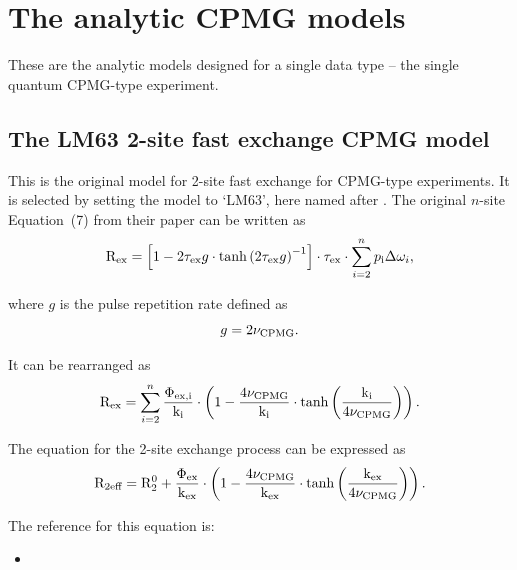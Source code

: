 
\section{The analytic CPMG models}
\label{sect: dispersion: analytic CPMG models}

These are the analytic models designed for a single data type -- the single quantum CPMG-type experiment.



\subsection{The LM63 2-site fast exchange CPMG model}
\label{sect: dispersion: LM63 model}

This is the original model for 2-site fast exchange for CPMG-type experiments.
It is selected by setting the model to `LM63', here named after \citet{LuzMeiboom63}.
The original $n$-site Equation~(7) from their paper can be written as
\begin{equation}
    \mathrm{R}_{\textrm{ex}} = \left[ 1 - 2\tau_{\textrm{ex}} g \cdot \tanh \left( 2\tau_{\textrm{ex}} g \right)^{-1} \right] \cdot \tau_{\textrm{ex}} \cdot \sum_{i=2}^n p_{\textrm{i}}\Delta\omega_{i},
\end{equation}

where $g$ is the pulse repetition rate defined as
\begin{equation}
    g = 2\nu_{\textrm{CPMG}}.
\end{equation}

It can be rearranged as
\begin{equation} \label{eq: Luz-Meiboom}
    \mathrm{R}_{\textrm{ex}} = \sum_{i=2}^n \frac{\Phi_{\textrm{ex,i}}}{\textrm{k}_{\textrm{i}}} \cdot \left( 1 - \frac{4\nu_{\textrm{CPMG}}}{\textrm{k}_{\textrm{i}}} \cdot \tanh \left( \frac{\textrm{k}_\textrm{i}}{4\nu_{\textrm{CPMG}}} \right) \right).
\end{equation}


The equation for the 2-site exchange process can be expressed as
\begin{equation}
    \mathrm{R}_{\textrm{2eff}} = \mathrm{R}_2^0 + \frac{\Phi_{\textrm{ex}}}{\textrm{k}_{\textrm{ex}}} \cdot \left( 1 - \frac{4\nu_{\textrm{CPMG}}}{\textrm{k}_{\textrm{ex}}} \cdot \tanh \left( \frac{\textrm{k}_{\textrm{ex}}}{4\nu_{\textrm{CPMG}}} \right) \right).
\end{equation}

The reference for this equation is:
\begin{itemize}
  \item {}
\end{itemize}

